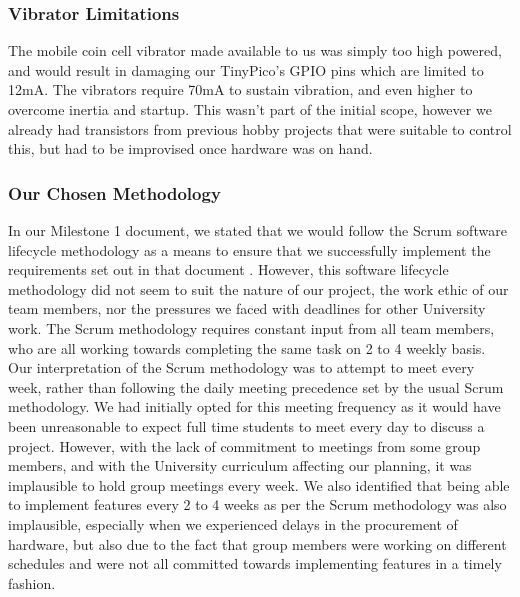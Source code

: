             \subsubsection{Vibrator Limitations}

                The mobile coin cell vibrator made available to us was simply too high powered, and would result in damaging our TinyPico's GPIO pins which are limited to 12mA. The vibrators require 70mA to sustain vibration, and even higher to overcome inertia and startup. This wasn't part of the initial scope, however we already had transistors from previous hobby projects that were suitable to control this, but had to be improvised once hardware was on hand.


            \subsubsection{Our Chosen Methodology}
            \label{subsubsec:methodology}

                In our Milestone 1 document, we stated that we would follow the Scrum software lifecycle methodology as a means to ensure that we successfully implement the requirements set out in that document \cite{coaker}. However, this software lifecycle methodology did not seem to suit the nature of our project, the work ethic of our team members, nor the pressures we faced with deadlines for other University work. The Scrum methodology requires constant input from all team members, who are all working towards completing the same task on 2 to 4 weekly basis. Our interpretation of the Scrum methodology was to attempt to meet every week, rather than following the daily meeting precedence set by the usual Scrum methodology. We had initially opted for this meeting frequency as it would have been unreasonable to expect full time students to meet every day to discuss a project. However, with the lack of commitment to meetings from some group members, and with the University curriculum affecting our planning, it was implausible to hold group meetings every week. We also identified that being able to implement features every 2 to 4 weeks as per the Scrum methodology was also implausible, especially when we experienced delays in the procurement of hardware, but also due to the fact that group members were working on different schedules and were not all committed towards implementing features in a timely fashion.

